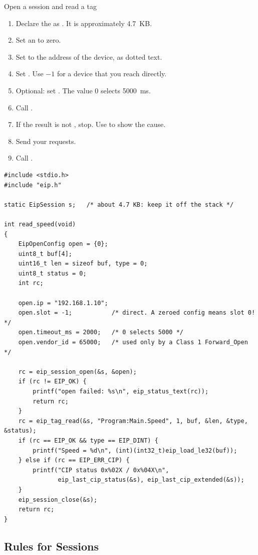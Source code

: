 \begin{procedure}{Open a session and read a tag}
\begin{enumerate}
  \item Declare the  as . It is approximately
        4.7~KB.
  \item Set an  to zero.
  \item Set  to the address of the device, as dotted text.
  \item Set . Use $-1$ for a device that you reach directly.
  \item Optional: set . The value 0 selects 5000~ms.
  \item Call .
  \item If the result is not , stop. Use
         to show the cause.
  \item Send your requests.
  \item Call .
\end{enumerate}
\end{procedure}

\begin{lstlisting}
#include <stdio.h>
#include "eip.h"

static EipSession s;   /* about 4.7 KB: keep it off the stack */

int read_speed(void)
{
    EipOpenConfig open = {0};
    uint8_t buf[4];
    uint16_t len = sizeof buf, type = 0;
    uint8_t status = 0;
    int rc;

    open.ip = "192.168.1.10";
    open.slot = -1;           /* direct. A zeroed config means slot 0! */
    open.timeout_ms = 2000;   /* 0 selects 5000 */
    open.vendor_id = 65000;   /* used only by a Class 1 Forward_Open */

    rc = eip_session_open(&s, &open);
    if (rc != EIP_OK) {
        printf("open failed: %s\n", eip_status_text(rc));
        return rc;
    }
    rc = eip_tag_read(&s, "Program:Main.Speed", 1, buf, &len, &type, &status);
    if (rc == EIP_OK && type == EIP_DINT) {
        printf("Speed = %d\n", (int)(int32_t)eip_load_le32(buf));
    } else if (rc == EIP_ERR_CIP) {
        printf("CIP status 0x%02X / 0x%04X\n",
               eip_last_cip_status(&s), eip_last_cip_extended(&s));
    }
    eip_session_close(&s);
    return rc;
}
\end{lstlisting}

\subsection{Rules for Sessions}

